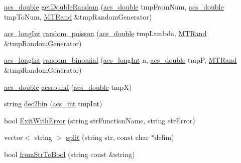 \begin{DoxyCompactItemize}
\item 
\hyperlink{a00050_ab776853a005fcbf56af0424a2a4dd607}{acs\-\_\-double} \hyperlink{a00056_aed308af1d3ee40e106e4e23e78644d07}{get\-Double\-Random} (\hyperlink{a00050_ab776853a005fcbf56af0424a2a4dd607}{acs\-\_\-double} tmp\-From\-Num, \hyperlink{a00050_ab776853a005fcbf56af0424a2a4dd607}{acs\-\_\-double} tmp\-To\-Num, \hyperlink{a00016}{M\-T\-Rand} \&tmp\-Random\-Generator)
\item 
\hyperlink{a00050_a19319d75f02db4308bc5c0026d98cd85}{acs\-\_\-long\-Int} \hyperlink{a00056_a22cddb6ffcf2250e0c90bc913728350f}{random\-\_\-poisson} (\hyperlink{a00050_ab776853a005fcbf56af0424a2a4dd607}{acs\-\_\-double} tmp\-Lambda, \hyperlink{a00016}{M\-T\-Rand} \&tmp\-Random\-Generator)
\item 
\hyperlink{a00050_a19319d75f02db4308bc5c0026d98cd85}{acs\-\_\-long\-Int} \hyperlink{a00056_a78d5b4a67b6e66b8ceaa85874a2a12b7}{random\-\_\-binomial} (\hyperlink{a00050_a19319d75f02db4308bc5c0026d98cd85}{acs\-\_\-long\-Int} n, \hyperlink{a00050_ab776853a005fcbf56af0424a2a4dd607}{acs\-\_\-double} tmp\-P, \hyperlink{a00016}{M\-T\-Rand} \&tmp\-Random\-Generator)
\item 
\hyperlink{a00050_ab776853a005fcbf56af0424a2a4dd607}{acs\-\_\-double} \hyperlink{a00056_a277c801cb0f8a290d7c28b6a67feff18}{acsround} (\hyperlink{a00050_ab776853a005fcbf56af0424a2a4dd607}{acs\-\_\-double} tmp\-X)
\item 
string \hyperlink{a00056_a1a13653eb649b6fc74090deecddf1028}{dec2bin} (\hyperlink{a00050_a8d277355641a098190360234e2ebde35}{acs\-\_\-int} tmp\-Int)
\item 
bool \hyperlink{a00056_aa678d0a98232158c48108227b98de4b6}{Exit\-With\-Error} (string str\-Function\-Name, string str\-Error)
\item 
vector$<$ string $>$ \hyperlink{a00056_a4d1aa74fac80ae0275c056575fdb6626}{split} (string str, const char $\ast$delim)
\item 
bool \hyperlink{a00056_aed580149796de6350e6fcfae9b2adb30}{from\-Str\-To\-Bool} (string const \&string)
\end{DoxyCompactItemize}


